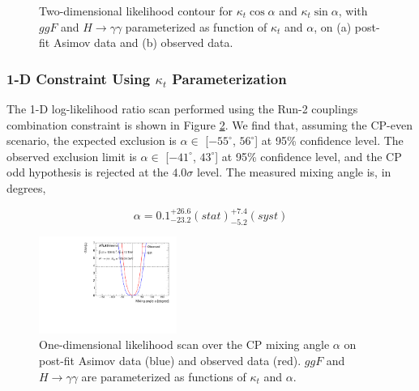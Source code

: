 \begin{figure}[htbp]
  \centering
  \caption{Two-dimensional likelihood contour for $\kappa_t \cos\alpha$ and $\kappa_t \sin\alpha$, with $ggF$ and $H \rightarrow \gamma\gamma$ parameterized as function of $\kappa_t$ and $\alpha$, on (a) post-fit Asimov data and (b) observed data.
  \label{fig:s3:contours}}
\end{figure}

\subsubsection{1-D Constraint Using $\kappa_{t}$ Parameterization}

The 1-D log-likelihood ratio scan performed using the Run-2 couplings combination constraint is shown in Figure \ref{fig:alphascan_expobs_resolve}. We find that, assuming the CP-even scenario, the expected exclusion is $\alpha \in$ [$-55^{\circ}$, $56^{\circ}$] at 95\% confidence level. The observed exclusion limit is  $\alpha \in$ [$-41^{\circ}$, $43^{\circ}$] at 95\% confidence level, and the CP odd hypothesis is rejected at the $4.0\sigma$ level. The measured mixing angle is, in degrees, 

\begin{equation}
\alpha = 0.1^{+26.6}_{-23.2}(stat)^{+7.4}_{-5.2}(syst)
\end{equation}

\begin{figure}[htbp]
  \centering
  \includegraphics[width=0.4\textwidth]{figures/tthcp_results/nllscan_alpha_expobs_resolve.pdf}
  \caption{One-dimensional likelihood scan over the CP mixing angle $\alpha$ on post-fit Asimov data (blue) and observed data (red).  $ggF$ and $H \rightarrow \gamma\gamma$ are parameterized as functions of $\kappa_t$ and $\alpha$.
  \label{fig:alphascan_expobs_resolve}}
\end{figure}
